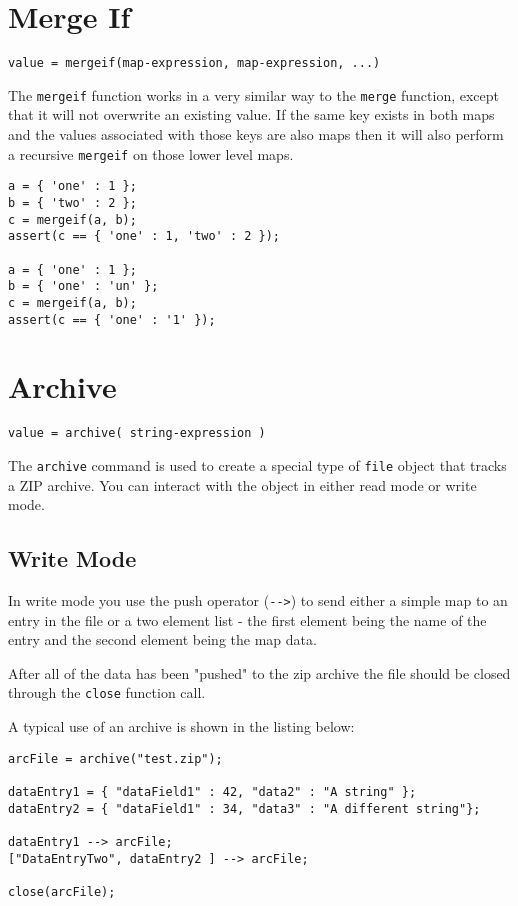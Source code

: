 \section{Merge If}
\begin{Verbatim}
value = mergeif(map-expression, map-expression, ...)
\end{Verbatim}

The \Verb+mergeif+ function works in a very similar way to the \verb+merge+ function, except that it will not overwrite an existing value. If the same key exists in both maps and the values associated with those keys are also maps then it will also perform a recursive \verb+mergeif+ on those lower level maps.

\begin{lstlisting}[caption={Merge If example}]
a = { 'one' : 1 };
b = { 'two' : 2 };
c = mergeif(a, b);
assert(c == { 'one' : 1, 'two' : 2 });

a = { 'one' : 1 };
b = { 'one' : 'un' };
c = mergeif(a, b);
assert(c == { 'one' : '1' });
\end{lstlisting}

\section{Archive}
\begin{Verbatim}
value = archive( string-expression )
\end{Verbatim}
The \Verb+archive+ command is used to create a special type of \verb+file+ object that tracks a ZIP archive. You can interact with the object in either read mode or write mode. 
\subsection{Write Mode}
In write mode you use the push operator (\Verb+-->+) to send either a simple map to an entry in the file or a two element list - the first element being the name of the entry and the second element being the map data.

After all of the data has been "pushed" to the zip archive the file should be closed through the \Verb+close+ function call.

A typical use of an archive is shown in the listing below:
\begin{lstlisting}[caption={Write to Archive example}]
arcFile = archive("test.zip");

dataEntry1 = { "dataField1" : 42, "data2" : "A string" };
dataEntry2 = { "dataField1" : 34, "data3" : "A different string"};

dataEntry1 --> arcFile;
["DataEntryTwo", dataEntry2 ] --> arcFile;

close(arcFile);
\end{lstlisting}


